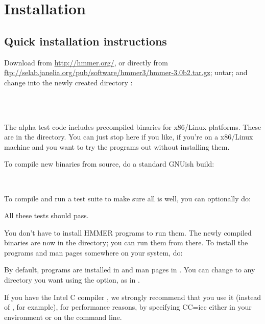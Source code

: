 \section{Installation}
\label{section:installation}
\setcounter{footnote}{0}

\subsection{Quick installation instructions}

Download  from
\url{http://hmmer.org/}, or directly from
\url{ftp://selab.janelia.org/pub/software/hmmer3/hmmer-3.0b2.tar.gz};
untar; and change into the newly created directory :

\\
\\

The alpha test code includes precompiled binaries for x86/Linux
platforms. These are in the  directory. You can just
stop here if you like, if you're on a x86/Linux machine and you want
to try the programs out without installing them.

To compile new binaries from source, do a standard GNUish build:

\\ 

To compile and run a test suite to make sure all is well, you can
optionally do:


All these tests should pass.

You don't have to install HMMER programs to run them. The newly
compiled binaries are now in the  directory; you can run
them from there. To install the programs and man pages somewhere on
your system, do:


By default, programs are installed in  and man
pages in . You can change 
to any directory you want using the 
option, as in .

If you have the Intel C compiler , we strongly recommend
that you use it (instead of , for example), for performance
reasons, by specifying {CC=icc} either in your environment or on the
 command line. 

